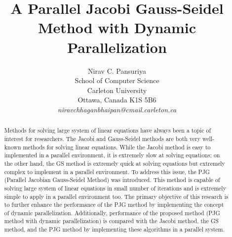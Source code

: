 \documentclass[11pt]{article}       %
\begin{document}


\title{A Parallel Jacobi Gauss-Seidel Method with Dynamic Parallelization}


\author{
Nirav C. Pansuriya\\
School of Computer Science\\
Carleton University\\
Ottawa, Canada K1S 5B6\\
{\em niravchhaganbhaipan@cmail.carleton.ca}
} %

\maketitle

\begin{abstract}
Methods for solving large system of linear equations have always been a topic of interest for researchers.  The Jacobi and Gauss-Seidel methods are both very well-known methods for solving linear equations. While the Jacobi method is easy to implemented in a parallel environment, it is extremely slow at solving equations; on the other hand, the GS method is extremely quick at solving equations but extremely complex to implement in a parallel environment. To address this issue, the PJG (Parallel Jacobian Gauss-Seidel Method) was introduced. This method is capable of solving large system of linear equations in small number of iterations and is extremely simple to apply in a parallel environment too. The primary objective of this research is to further enhance the performance of the PJG method by implementing the concept of dynamic parallelization. Additionally, performance of the proposed method (PJG method with dynamic parallelization) is compared with the Jacobi method, the GS method, and the PJG method by implementing these algorithms in a parallel system.
\end{abstract}
\end{document}
